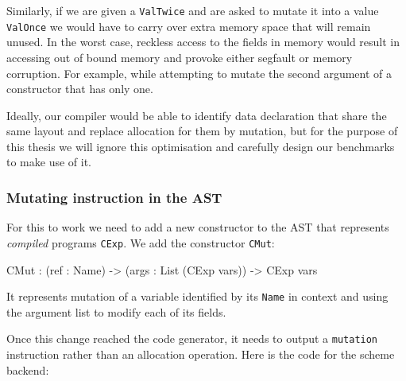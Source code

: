 \documentclass[
]{article}
\newenvironment{Shaded}{}{}
\newcommand{\DataTypeTok}[1]{\textcolor[rgb]{0.56,0.13,0.00}{#1}}
\newcommand{\NormalTok}[1]{#1}
\newcommand{\OperatorTok}[1]{\textcolor[rgb]{0.40,0.40,0.40}{#1}}
\newcommand{\OtherTok}[1]{\textcolor[rgb]{0.00,0.44,0.13}{#1}}
\begin{document}
Similarly, if we are given a \texttt{ValTwice} and are asked to mutate
it into a value \texttt{ValOnce} we would have to carry over extra
memory space that will remain unused. In the worst case, reckless access
to the fields in memory would result in accessing out of bound memory
and provoke either segfault or memory corruption. For example, while
attempting to mutate the second argument of a constructor that has only
one.

Ideally, our compiler would be able to identify data declaration that
share the same layout and replace allocation for them by mutation, but
for the purpose of this thesis we will ignore this optimisation and
carefully design our benchmarks to make use of it.

\hypertarget{mutating-instruction-in-the-ast}{%
\subsubsection{Mutating instruction in the
AST}\label{mutating-instruction-in-the-ast}}

For this to work we need to add a new constructor to the AST that
represents \emph{compiled} programs \texttt{CExp}. We add the
constructor \texttt{CMut}:

\begin{Shaded}
\begin{Highlighting}[]
\DataTypeTok{CMut} \OperatorTok{:}\NormalTok{ (ref }\OperatorTok{:} \DataTypeTok{Name}\NormalTok{) }\OtherTok{{-}\textgreater{}}\NormalTok{ (args }\OperatorTok{:} \DataTypeTok{List}\NormalTok{ (}\DataTypeTok{CExp}\NormalTok{ vars)) }\OtherTok{{-}\textgreater{}} \DataTypeTok{CExp}\NormalTok{ vars }
\end{Highlighting}
\end{Shaded}

It represents mutation of a variable identified by its \texttt{Name} in
context and using the argument list to modify each of its fields.

Once this change reached the code generator, it needs to output a
\texttt{mutation} instruction rather than an allocation operation. Here
is the code for the scheme backend:
\end{document}
